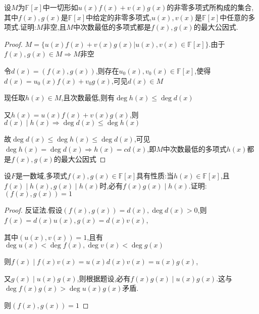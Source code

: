 \begin{example}
    设$M$为$\mathbb{F}[x]$中一切形如$u(x)f(x)+v(x)g(x)$的非零多项式所构成的集合,其中$f(x),g(x)$是$\mathbb{F}[x]$中给定的非零多项式,$u(x),v(x)$是$\mathbb{F}[x]$中任意的多项式.证明:$M$非空,且$M$中次数最低的多项式都是$f(x),g(x)$的最大公因式. 
\end{example}

\begin{proof}

    $M=\{u(x)f(x)+v(x)g(x)|u(x),v(x)\in \mathbb{F}[x]\}$.由于$f(x),g(x)\in M\Longrightarrow M$非空

    令$d(x)=(f(x),g(x))$,则存在$u_0(x),v_0(x)\in \mathbb{F}[x]$,使得$d(x)=u_0(x)f(x)+v_0g(x)$,可见$d(x)\in M$

    现任取$h(x)\in M$,且次数最低,则有$\deg h(x)\le \deg d(x)$

    又$h(x)=u(x)f(x)+v(x)g(x)$,则$d(x)\mid h(x)\Longrightarrow \deg d(x)\le \deg h(x)$

    故$\deg d(x)\le \deg h(x) \le \deg d(x)$,可见$\deg h(x)=\deg d(x)\Longrightarrow h(x)=cd(x)$,即$M$中次数最低的多项式$h(x)$都是$f(x),g(x)$的最大公因式 
\end{proof}

\begin{example}
    设$F$是一数域,多项式$f(x),g(x)\in \mathbb{F}[x]$具有性质:当$h(x)\in \mathbb{F}[x]$,且$f(x)\mid h(x),g(x)\mid h(x)$时,必有$f(x)g(x)\mid h(x)$.证明:$(f(x),g(x))=1$
\end{example}

\begin{proof}
    
    反证法.假设$(f(x),g(x))=d(x),\deg d(x)>0$,则$f(x)=d(x)u(x),g(x)=d(x)v(x)$,
    
    其中$(u(x),v(x))=1$,且有$\deg u(x)<\deg f(x),\deg v(x)<\deg g(x)$

    则$f(x)\mid f(x)v(x) = u(x)d(x)v(x)=u(x)g(x)$,
    
    又$g(x)\mid u(x)g(x)$,则根据题设,必有$f(x)g(x)\mid u(x)g(x)$.这与$\deg f(x)g(x)>\deg u(x)g(x)$矛盾. 

    则$(f(x),g(x))=1$
\end{proof}